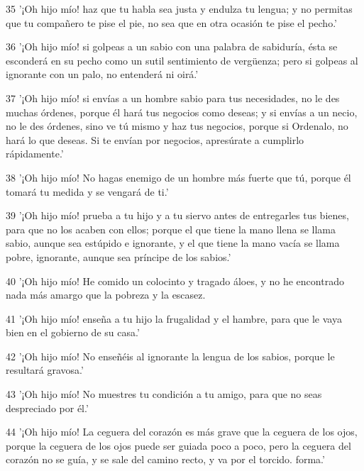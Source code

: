 \par 35 '¡Oh hijo mío! haz que tu habla sea justa y endulza tu lengua; y no permitas que tu compañero te pise el pie, no sea que en otra ocasión te pise el pecho.'

\par 36 '¡Oh hijo mío! si golpeas a un sabio con una palabra de sabiduría, ésta se esconderá en su pecho como un sutil sentimiento de vergüenza; pero si golpeas al ignorante con un palo, no entenderá ni oirá.'

\par 37 '¡Oh hijo mío! si envías a un hombre sabio para tus necesidades, no le des muchas órdenes, porque él hará tus negocios como deseas; y si envías a un necio, no le des órdenes, sino ve tú mismo y haz tus negocios, porque si Ordenalo, no hará lo que deseas. Si te envían por negocios, apresúrate a cumplirlo rápidamente.'

\par 38 '¡Oh hijo mío! No hagas enemigo de un hombre más fuerte que tú, porque él tomará tu medida y se vengará de ti.'

\par 39 '¡Oh hijo mío! prueba a tu hijo y a tu siervo antes de entregarles tus bienes, para que no los acaben con ellos; porque el que tiene la mano llena se llama sabio, aunque sea estúpido e ignorante, y el que tiene la mano vacía se llama pobre, ignorante, aunque sea príncipe de los sabios.'

\par 40 '¡Oh hijo mío! He comido un colocinto y tragado áloes, y no he encontrado nada más amargo que la pobreza y la escasez.

\par 41 '¡Oh hijo mío! enseña a tu hijo la frugalidad y el hambre, para que le vaya bien en el gobierno de su casa.'

\par 42 '¡Oh hijo mío! No enseñéis al ignorante la lengua de los sabios, porque le resultará gravosa.'

\par 43 '¡Oh hijo mío! No muestres tu condición a tu amigo, para que no seas despreciado por él.'

\par 44 '¡Oh hijo mío! La ceguera del corazón es más grave que la ceguera de los ojos, porque la ceguera de los ojos puede ser guiada poco a poco, pero la ceguera del corazón no se guía, y se sale del camino recto, y va por el torcido. forma.'

